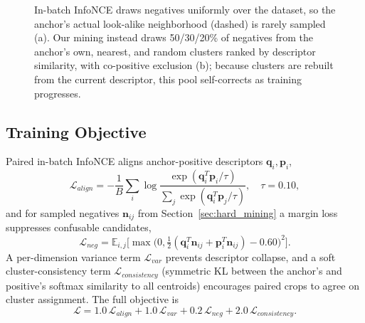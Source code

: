 \documentclass[conference]{IEEEtran}
\begin{document}
\begin{figure}[t]
{%
}
\caption{In-batch InfoNCE draws negatives uniformly over the dataset, so
the anchor's actual look-alike neighborhood (dashed) is rarely sampled
(a). Our mining instead draws 50/30/20\% of negatives from the anchor's
own, nearest, and random clusters ranked by descriptor similarity, with
co-positive exclusion (b); because clusters are rebuilt from the current
descriptor, this pool self-corrects as training progresses.}
\label{fig:mining_comparison}
\end{figure}

\subsection{Training Objective}
Paired in-batch InfoNCE aligns anchor-positive descriptors
$\mathbf{q}_i,\mathbf{p}_i$,
\begin{equation}
\mathcal{L}_{align} = -\frac{1}{B}\sum_i \log
\frac{\exp(\mathbf{q}_i^T\mathbf{p}_i/\tau)}
{\sum_j \exp(\mathbf{q}_i^T\mathbf{p}_j/\tau)}, \quad \tau=0.10,
\end{equation}
and for sampled negatives $\mathbf{n}_{ij}$ from Section~\ref{sec:hard_mining}
a margin loss suppresses confusable candidates,
\begin{equation}
\mathcal{L}_{neg} = \mathbb{E}_{i,j}\Big[\max\big(0,
\tfrac{1}{2}(\mathbf{q}_i^T\mathbf{n}_{ij}+\mathbf{p}_i^T\mathbf{n}_{ij})
-0.60\big)^2\Big].
\end{equation}
A per-dimension variance term $\mathcal{L}_{var}$ prevents descriptor
collapse, and a soft cluster-consistency term $\mathcal{L}_{consistency}$
(symmetric KL between the anchor's and positive's softmax similarity to
all centroids) encourages paired crops to agree on cluster assignment.
The full objective is
\begin{equation}
\mathcal{L} = 1.0\,\mathcal{L}_{align} + 1.0\,\mathcal{L}_{var}
+ 0.2\,\mathcal{L}_{neg} + 2.0\,\mathcal{L}_{consistency}.
\end{equation}
\end{document}
